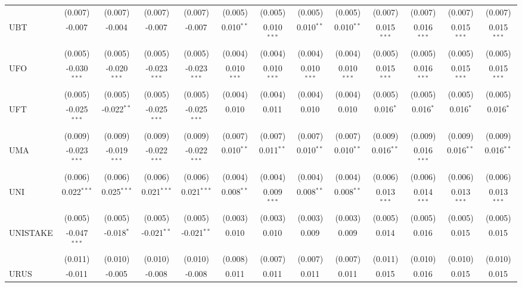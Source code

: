\begin{table}[!htbp]
\begin{tabular}{@{\extracolsep{5pt}}lcccccccccccc}
  & (0.007) & (0.007) & (0.007) & (0.007) & (0.005) & (0.005) & (0.005) & (0.005) & (0.007) & (0.007) & (0.007) & (0.007) \\
 UBT & -0.007$^{}$ & -0.004$^{}$ & -0.007$^{}$ & -0.007$^{}$ & 0.010$^{**}$ & 0.010$^{***}$ & 0.010$^{**}$ & 0.010$^{**}$ & 0.015$^{***}$ & 0.016$^{***}$ & 0.015$^{***}$ & 0.015$^{***}$ \\
  & (0.005) & (0.005) & (0.005) & (0.005) & (0.004) & (0.004) & (0.004) & (0.004) & (0.005) & (0.005) & (0.005) & (0.005) \\
 UFO & -0.030$^{***}$ & -0.020$^{***}$ & -0.023$^{***}$ & -0.023$^{***}$ & 0.010$^{***}$ & 0.010$^{***}$ & 0.010$^{***}$ & 0.010$^{***}$ & 0.015$^{***}$ & 0.016$^{***}$ & 0.015$^{***}$ & 0.015$^{***}$ \\
  & (0.005) & (0.005) & (0.005) & (0.005) & (0.004) & (0.004) & (0.004) & (0.004) & (0.005) & (0.005) & (0.005) & (0.005) \\
 UFT & -0.025$^{***}$ & -0.022$^{**}$ & -0.025$^{***}$ & -0.025$^{***}$ & 0.010$^{}$ & 0.011$^{}$ & 0.010$^{}$ & 0.010$^{}$ & 0.016$^{*}$ & 0.016$^{*}$ & 0.016$^{*}$ & 0.016$^{*}$ \\
  & (0.009) & (0.009) & (0.009) & (0.009) & (0.007) & (0.007) & (0.007) & (0.007) & (0.009) & (0.009) & (0.009) & (0.009) \\
 UMA & -0.023$^{***}$ & -0.019$^{***}$ & -0.022$^{***}$ & -0.022$^{***}$ & 0.010$^{**}$ & 0.011$^{**}$ & 0.010$^{**}$ & 0.010$^{**}$ & 0.016$^{**}$ & 0.016$^{***}$ & 0.016$^{**}$ & 0.016$^{**}$ \\
  & (0.006) & (0.006) & (0.006) & (0.006) & (0.004) & (0.004) & (0.004) & (0.004) & (0.006) & (0.006) & (0.006) & (0.006) \\
 UNI & 0.022$^{***}$ & 0.025$^{***}$ & 0.021$^{***}$ & 0.021$^{***}$ & 0.008$^{**}$ & 0.009$^{***}$ & 0.008$^{**}$ & 0.008$^{**}$ & 0.013$^{***}$ & 0.014$^{***}$ & 0.013$^{***}$ & 0.013$^{***}$ \\
  & (0.005) & (0.005) & (0.005) & (0.005) & (0.003) & (0.003) & (0.003) & (0.003) & (0.005) & (0.005) & (0.005) & (0.005) \\
 UNISTAKE & -0.047$^{***}$ & -0.018$^{*}$ & -0.021$^{**}$ & -0.021$^{**}$ & 0.010$^{}$ & 0.010$^{}$ & 0.009$^{}$ & 0.009$^{}$ & 0.014$^{}$ & 0.016$^{}$ & 0.015$^{}$ & 0.015$^{}$ \\
  & (0.011) & (0.010) & (0.010) & (0.010) & (0.008) & (0.007) & (0.007) & (0.007) & (0.011) & (0.010) & (0.010) & (0.010) \\
 URUS & -0.011$^{}$ & -0.005$^{}$ & -0.008$^{}$ & -0.008$^{}$ & 0.011$^{}$ & 0.011$^{}$ & 0.011$^{}$ & 0.011$^{}$ & 0.015$^{}$ & 0.016$^{}$ & 0.015$^{}$ & 0.015$^{}$ \\

\end{tabular}
\end{table}
